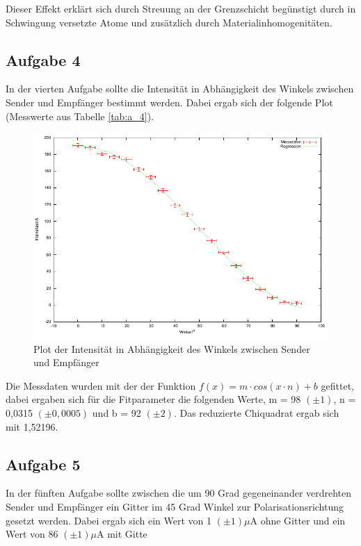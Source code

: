 \documentclass[12pt]{scrartcl}
\begin{document}
Dieser Effekt erklärt sich durch Streuung an der Grenzschicht begünstigt durch in Schwingung versetzte Atome und zusätzlich durch Materialinhomogenitäten.

\subsection{Aufgabe 4}
In der vierten Aufgabe sollte die Intensität in Abhängigkeit des Winkels zwischen Sender und Empfänger bestimmt werden. Dabei ergab sich der folgende Plot (Messwerte aus Tabelle \ref{tab:a_4}).

\begin{figure}[H]
\centering
    \includegraphics[scale = 1]{a_4.pdf}
  	\caption[Plot der Intensität in Abhängigkeit des Winkels zwischen Sender und Empfänger]{Plot der Intensität in Abhängigkeit des Winkels zwischen Sender und Empfänger}
  \label{fig:a_4}
\end{figure}

Die Messdaten wurden mit der der Funktion $ f(x) = m \cdot cos(x \cdot n) + b$ gefittet, dabei ergaben sich für die Fitparameter die folgenden Werte, m = 98 $(\pm 1)$, n = 0,0315 $(\pm 0,0005)$ und b = 92 $(\pm 2)$. Das reduzierte Chiquadrat ergab sich mit 1,52196.

\subsection{Aufgabe 5}
In der fünften Aufgabe sollte zwischen die um 90 Grad gegeneinander verdrehten Sender und Empfänger ein Gitter im 45 Grad Winkel zur Polarisationsrichtung gesetzt werden. Dabei ergab sich ein Wert von 1 $(\pm 1) \mu$A ohne Gitter und ein Wert von 86 $(\pm 1) \mu$A mit Gitte
\end{document}
